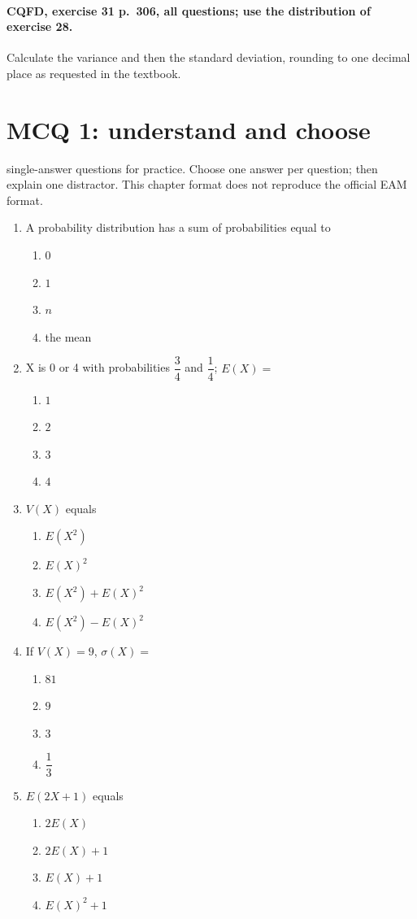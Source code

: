 \paragraph{CQFD, exercise 31 p.~306, all questions; use the distribution of exercise 28.}\label{C08-M2} Calculate the variance and then the standard deviation, rounding to one decimal place as requested in the textbook.
\begingroup\small
\mxnewpage\section*{MCQ 1: understand and choose}\label{C08-Q1}
 single-answer questions for practice. Choose one answer per question; then explain one distractor. This chapter format does not reproduce the official EAM format.
\begin{enumerate}
\item A probability distribution has a sum of probabilities equal to
\begin{enumerate}[label=\Alph*.,itemsep=2pt]
\item $0$
\item $1$
\item $n$
\item the mean
\end{enumerate}
\item X is 0 or 4 with probabilities $\dfrac{3}{4}$ and $\dfrac{1}{4}$; $E(X)=$
\begin{enumerate}[label=\Alph*.,itemsep=2pt]
\item $1$
\item $2$
\item $3$
\item $4$
\end{enumerate}
\item $V(X)$ equals
\begin{enumerate}[label=\Alph*.,itemsep=2pt]
\item $E(X^2)$
\item $E(X)^2$
\item $E(X^2)+E(X)^2$
\item $E(X^2)-E(X)^2$
\end{enumerate}
\item If $V(X)=9$, $\sigma(X)=$
\begin{enumerate}[label=\Alph*.,itemsep=2pt]
\item $81$
\item $9$
\item $3$
\item $\dfrac{1}{3}$
\end{enumerate}
\item $E(2X+1)$ equals
\begin{enumerate}[label=\Alph*.,itemsep=2pt]
\item $2E(X)$
\item $2E(X)+1$
\item $E(X)+1$
\item $E(X)^2+1$
\end{enumerate}
\end{enumerate}
